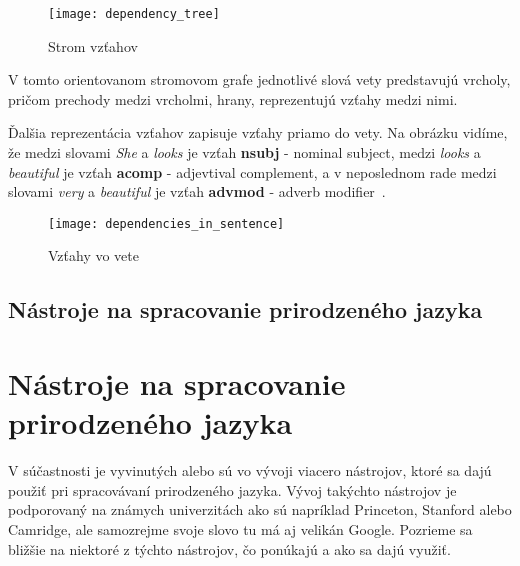\begin{figure}[H]
\begin{center}\texttt{[image: dependency\_tree]}\end{center}
\caption[Strom vzťahov]{Strom vzťahov}\label{fig:dependency_tree}
\end{figure}

V tomto orientovanom stromovom grafe jednotlivé slová vety predstavujú vrcholy, pričom prechody medzi vrcholmi, hrany, reprezentujú vzťahy medzi nimi.

Ďalšia reprezentácia vzťahov zapisuje vzťahy priamo do vety. Na obrázku  vidíme, že medzi slovami \textit{She} a \textit{looks} je vzťah \textbf{nsubj} - nominal subject, medzi \textit{looks} a \textit{beautiful} je vzťah \textbf{acomp} - adjevtival complement, a v neposlednom rade medzi slovami \textit{very} a \textit{beautiful} je vzťah \textbf{advmod} - adverb modifier~\cite{StanfordDepManual}.

\begin{figure}[H]
\begin{center}\texttt{[image: dependencies\_in\_sentence]}\end{center}
\caption[Vzťahy vo vete]{Vzťahy vo vete}\label{fig:dependencies_in_sentence}
\end{figure}

%
%
{
	\subsection{Nástroje na spracovanie prirodzeného jazyka}
}
{
	\section{Nástroje na spracovanie prirodzeného jazyka}
}
\label{subsec:nlp_nastroje}
V súčastnosti je vyvinutých alebo sú vo vývoji viacero nástrojov, ktoré sa dajú použiť pri spracovávaní prirodzeného jazyka. Vývoj takýchto nástrojov je podporovaný na známych univerzitách ako sú napríklad Princeton, Stanford alebo Camridge, ale samozrejme svoje slovo tu má aj velikán Google. Pozrieme sa bližšie na niektoré z týchto nástrojov, čo ponúkajú a ako sa dajú využiť.

